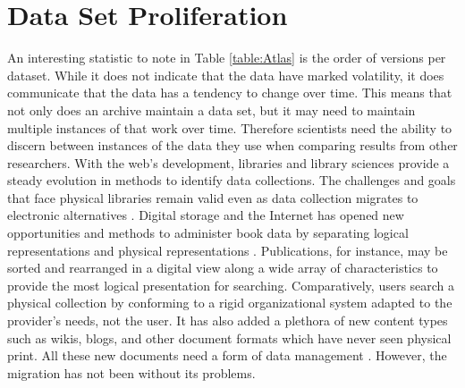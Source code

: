 \section{Data Set Proliferation}

An interesting statistic to note in Table \ref{table:Atlas} is the order of versions per dataset.
While it does not indicate that the data have marked volatility, it does communicate that the data has a tendency to change over time.
This means that not only does an archive maintain a data set, but it may need to maintain multiple instances of that work over time.
Therefore scientists need the ability to discern between instances of the data they use when comparing results from other researchers.
With the web's development, libraries and library sciences provide a steady evolution in methods to identify data collections.
The challenges and goals that face physical libraries remain valid even as data collection migrates to electronic alternatives \cite{rohtua}.
Digital storage and the Internet has opened new opportunities and methods to administer book data by separating logical representations and physical representations \cite{Barkstrom_digitallibrary}.
Publications, for instance, may be sorted and rearranged in a digital view along a wide array of characteristics to provide the most logical presentation for searching.
Comparatively, users search a physical collection by conforming to a rigid organizational system adapted to the provider's needs, not the user. 
It has also added a plethora of new content types such as wikis, blogs, and other document formats which have never seen physical print.
All these new documents need a form of data management \cite{Berberich:2007:TMT:1277741.1277831}.
However, the migration has not been without its problems.

